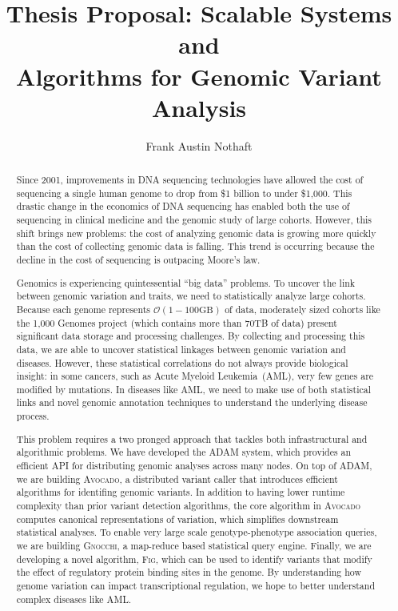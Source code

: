 \documentclass[11pt]{article} %
\begin{document}
\title{Thesis Proposal: Scalable Systems and \\ Algorithms for Genomic Variant Analysis}
\author{Frank Austin Nothaft} 
\date{}

\maketitle

\begin{abstract}

Since 2001, improvements in DNA sequencing technologies have allowed the cost of sequencing a
single human genome to drop from \$1 billion to under \$1,000. This drastic change in the
economics of DNA sequencing
has enabled both the use of sequencing in clinical medicine and the genomic study of large
cohorts. However, this shift brings new problems: the cost of analyzing genomic data is
growing more quickly than the cost of collecting genomic data is falling. This trend is
occurring because the decline in the cost of sequencing is outpacing Moore's law.

Genomics is experiencing quintessential ``big data'' problems. To uncover the link between
genomic variation and traits, we need to statistically analyze large cohorts. Because each
genome represents $\mathcal{O}(1-100\text{GB})$ of data, moderately sized cohorts like the
1,000 Genomes project (which contains more than 70TB of data) present significant data
storage and processing challenges. By collecting and processing this data, we are able to
uncover statistical linkages between genomic variation and diseases. However, these statistical
correlations do not always provide biological insight: in some cancers, such as Acute
Myeloid Leukemia~(AML), very few genes are modified by mutations. In diseases like AML,
we need to make use of both statistical links and novel genomic annotation techniques to
understand the underlying disease process.

This problem requires a two pronged approach that tackles both infrastructural and
algorithmic problems. We have developed the \textsc{ADAM} system, which provides an efficient
API for distributing genomic analyses across many nodes. On top of \textsc{ADAM}, we are
building \textsc{Avocado}, a distributed variant caller that introduces efficient algorithms
for identifing genomic variants. In addition to having lower runtime complexity than prior
variant detection algorithms, the core algorithm in \textsc{Avocado} computes canonical
representations of variation, which simplifies downstream statistical analyses. To enable
very large scale genotype-phenotype association queries, we are building \textsc{Gnocchi},
a map-reduce based statistical query engine. Finally, we are developing a novel algorithm,
\textsc{Fig}, which can be used to identify variants that modify the effect of regulatory
protein binding sites in the genome. By understanding how genome variation can impact
transcriptional regulation, we hope to better understand complex diseases like AML.

\end{abstract}
\end{document}
